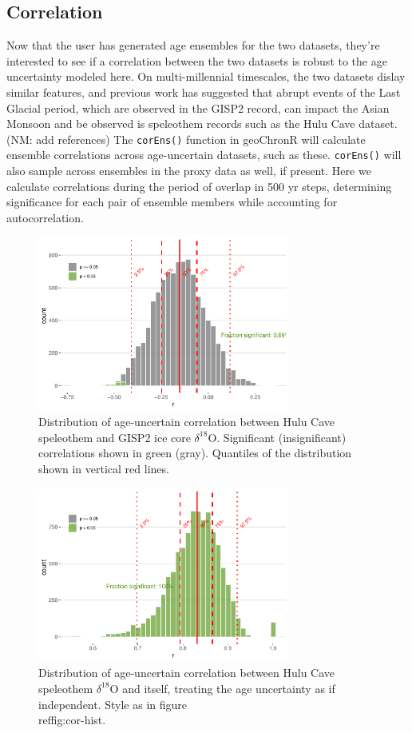 \documentclass[gchron, manuscript]{copernicus}
\begin{document}
\subsection{Correlation}

Now that the user has generated age ensembles for the two datasets, they're interested to see if a correlation between the two datasets is robust to the age uncertainty modeled here.
On multi-millennial timescales, the two datasets dislay similar features, and previous work has suggested that abrupt events of the Last Glacial period, which are observed in the GISP2 record, can impact the Asian Monsoon and be observed is speleothem records such as the Hulu Cave dataset. (NM: add references)
The \texttt{corEns()} function in geoChronR will calculate ensemble correlations across age-uncertain datasets, such as these.
\texttt{corEns()} will also sample across ensembles in the proxy data as well, if present.
Here we calculate correlations during the period of overlap in 500 yr steps, determining significance for each pair of ensemble members while accounting for autocorrelation.

\begin{figure}
\includegraphics[width=8.3cm]{geoChronR-paper_files/figure-latex/cor-hist-1} \caption{Distribution of age-uncertain correlation between Hulu Cave speleothem and GISP2 ice core $\delta^{18}$O. Significant (insignificant) correlations shown in green (gray).  Quantiles of the distribution shown in vertical red lines.}\label{fig:cor-hist}
\end{figure}

\begin{figure}
\includegraphics[width=8.3cm]{geoChronR-paper_files/figure-latex/hulu-cor-hist-1} \caption{Distribution of age-uncertain correlation between Hulu Cave speleothem $\delta^{18}$O and itself, treating the age uncertainty as if independent. Style as in figure \\ref{fig:cor-hist}.}\label{fig:hulu-cor-hist}
\end{figure}
\end{document}
